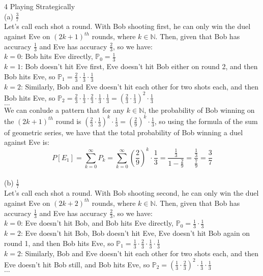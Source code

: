 \documentclass{article}
\begin{document}
{\Large 4 Playing Strategically} \\[.5cm]
{\color{red} (a) $\frac{3}{7}$} \\

Let's call each shot a round. With Bob shooting first, he can only win the duel against Eve on $(2k+1)^{th}$ rounds, where $k\in\mathbb{N}$. Then, given that Bob has accuracy $\frac{1}{3}$ and Eve has accuracy $\frac{2}{3}$, so we have:\\

$k = 0$: Bob hits Eve directly, $\mathbb{P}_0 = \frac{1}{3}$ \\
\indent $k = 1$: Bob doesn't hit Eve first, Eve doesn't hit Bob either on round 2, and then Bob hits Eve, so $\mathbb{P}_1 = \frac{2}{3}\cdot \frac{1}{3}\cdot \frac{1}{3}$ \\
\indent $k = 2$: Similarly, Bob and Eve doesn't hit each other for two shots each, and then Bob hits Eve, so $\mathbb{P}_2 = \frac{2}{3}\cdot \frac{1}{3}\cdot \frac{2}{3}\cdot \frac{1}{3}\cdot \frac{1}{3} = (\frac{2}{3}\cdot \frac{1}{3})^2\cdot \frac{1}{3}$ \\
\indent $\dots$ \\

We can conlude a pattern that for any $k\in\mathbb{N}$, the probability of Bob winning on the $(2k+1)^{th}$ round is $(\frac{2}{3}\cdot \frac{1}{3})^{k} \cdot \frac{1}{3} = (\frac{2}{9})^k\cdot \frac{1}{3}$, so using the formula of the sum of geometric series, we have that the total probability of Bob winning a duel against Eve is:
$$P[E_1] = \sum\limits_{k=0}^\infty P_k = 
\sum\limits_{k=0}^\infty (\frac{2}{9})^k\cdot \frac{1}{3} = \frac{\frac{1}{3}}{1-\frac{2}{9}} = \frac{\frac{1}{3}}{\frac{7}{9}} = \frac{3}{7}$$ \\[.5cm]
{\color{red} (b) $\frac{1}{7}$} \\

Let's call each shot a round. With Bob shooting second, he can only win the duel against Eve on $(2k+2)^{th}$ rounds, where $k\in\mathbb{N}$. Then, given that Bob has accuracy $\frac{1}{3}$ and Eve has accuracy $\frac{2}{3}$, so we have:\\

$k = 0$: Eve doesn't hit Bob, and Bob hits Eve directly, $\mathbb{P}_0 = \frac{1}{3}\cdot \frac{1}{3}$ \\
\indent $k = 2$: Eve doesn't hit Bob, Bob doesn't hit Eve, Eve doesn't hit Bob again on round 1, and then Bob hits Eve, so $\mathbb{P}_1 = 
\frac{1}{3}\cdot\frac{2}{3} \cdot \frac{1}{3}\cdot \frac{1}{3}$ \\
\indent $k = 2$: Similarly, Bob and Eve doesn't hit each other for two shots each, and then Eve doesn't hit Bob still, and Bob hits Eve, so $\mathbb{P}_2 = 
(\frac{1}{3}\cdot\frac{2}{3})^2 \cdot \frac{1}{3}\cdot \frac{1}{3}$ \\
\indent $\dots$ \\
\end{document}
